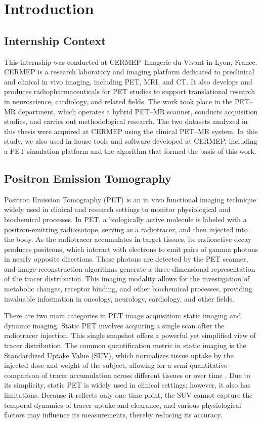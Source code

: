 \chapter{Introduction}
\section{Internship Context}
This internship was conducted at CERMEP--Imagerie du Vivant in Lyon, France.
CERMEP is a research laboratory and imaging platform dedicated to preclinical and clinical in vivo imaging, including PET, MRI, and CT.
It also develops and produces radiopharmaceuticals for PET studies to support translational research in neuroscience, cardiology, and related fields.
The work took place in the PET--MR department, which operates a hybrid PET--MR scanner, conducts acquisition studies, and carries out methodological research.
The two datasets analyzed in this thesis were acquired at CERMEP using the clinical PET--MR system.
In this study, we also used in-house tools and software developed at CERMEP, including a PET simulation platform and the algorithm that formed the basis of this work.

\section{Positron Emission Tomography}
Positron Emission Tomography (PET) is an in vivo functional imaging technique widely used in clinical and research settings to monitor physiological and biochemical processes.
In PET, a biologically active molecule is labeled with a positron-emitting radioisotope, serving as a radiotracer, and then injected into the body.
As the radiotracer accumulates in target tissues, its radioactive decay produces positrons, which interact with electrons to emit pairs of gamma photons in nearly opposite directions.
These photons are detected by the PET scanner, and image reconstruction algorithms generate a three-dimensional representation of the tracer distribution.
This imaging modality allows for the investigation of metabolic changes, receptor binding, and other biochemical processes, providing invaluable information in oncology, neurology, cardiology, and other fields.

There are two main categories in PET image acquisition: static imaging and dynamic imaging.
Static PET involves acquiring a single scan after the radiotracer injection.
This single snapshot offers a powerful yet simplified view of tracer distribution.
The common quantification metric in static imaging is the Standardized Uptake Value (SUV), which normalizes tissue uptake by the injected dose and weight of the subject, allowing for a semi-quantitative comparison of tracer accumulation across different tissues or over time \cite{keyes1995suv}.
Due to its simplicity, static PET is widely used in clinical settings; however, it also has limitations.
Because it reflects only one time point, the SUV cannot capture the temporal dynamics of tracer uptake and clearance, and various physiological factors may influence its measurements, thereby reducing its accuracy.


